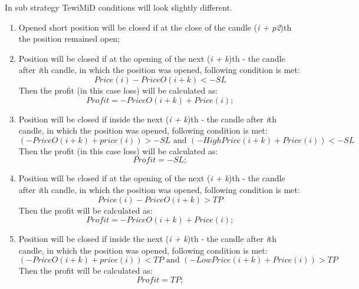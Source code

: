 \documentclass{tewiart}
\begin{document}
\noindent In sub strategy TewiMiD conditions will look slightly different.
\begin{enumerate}
\item Opened short position will be closed if at the close of the candle (\textit{i + p2})th the position remained open;\\


\item Position will be closed if at the opening of the next (\textit{i + k})th - the candle after \textit{i}th candle, in which the position was opened, following condition is met:
\begin{equation}
Price(i)-PriceO(i+k)<-SL
\end{equation}                                      
Then the profit (in this case loss) will be calculated as:
\begin{equation}
Profit =-PriceO (i+k) +  Price(i) ;
\end{equation}

\item Position will be closed if inside the next (\textit{i + k})th - the candle after \textit{i}th candle, in which the position was opened, following condition is met:
\begin{equation}
(-PriceO (i+k)+price(i) )>-SL \text{ and } (-HighPrice(i+k)+Price(i))<-SL
\end{equation}                          
Then the profit (in this case loss) will be calculated as:
\begin{equation}
Profit =-SL; 
\end{equation}

\item Position will be closed if at the opening of the next (\textit{i + k})th - the candle after \textit{i}th candle, in which the position was opened, following condition is met:
\begin{equation}
Price(i)-PriceO(i+k)>TP
\end{equation}                                           
Then the profit will be calculated as:
\begin{equation}
Profit =-PriceO (i+k)  + Price(i) ;
\end{equation} 


\item Position will be closed if inside the next (\textit{i + k})th - the candle after \textit{i}th candle, in which the position was opened, following condition is met: 
\begin{equation}
(-PriceO(i+k)+price(i) )<TP \text{ and } (-LowPrice(i+k)+Price(i))>TP
\end{equation}
Then the profit will be calculated as:
\begin{equation}
Profit =TP; 
\end{equation}


\end{enumerate}
\end{document}
